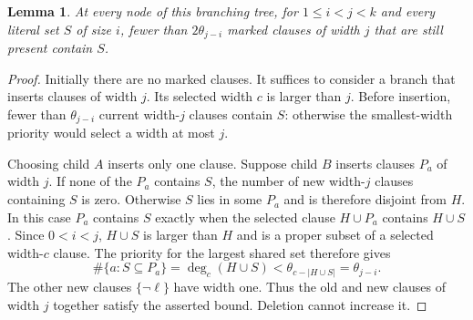 \documentclass[11pt,reqno]{amsart}
\numberwithin{equation}{section}
\newtheorem{lemma}[theorem]{Lemma}
\theoremstyle{definition}\newtheorem{definition}[theorem]{Definition}
\theoremstyle{remark}\newtheorem{remark}[theorem]{Remark}
\renewcommand{\le}{\leqslant}
\begin{document}
\begin{lemma}\label{lem:spar-marked-degree}
At every node of this branching tree, for $1\le i<j<k$ and every
literal set $S$ of size $i$,
fewer than $2\theta_{j-i}$ marked clauses of width $j$ that are
still present contain $S$.
\end{lemma}
\begin{proof}
Initially there are no marked clauses. It suffices to consider a branch
that inserts clauses of width $j$. Its selected width $c$ is larger than
$j$. Before insertion, fewer than $\theta_{j-i}$ current width-$j$
clauses contain $S$: otherwise the smallest-width priority would select
a width at most $j$.

Choosing child $A$ inserts only one clause.
Suppose child $B$ inserts clauses $P_a$ of width $j$.
If none of the $P_a$ contains $S$, the number of new width-$j$ clauses
containing $S$ is zero. Otherwise $S$ lies in some $P_a$ and is therefore
disjoint from $H$. In this case $P_a$ contains $S$ exactly when the
selected clause $H\cup P_a$ contains $H\cup S$. Since $0<i<j$,
$H\cup S$ is larger than $H$ and is a proper subset of a selected
width-$c$ clause.
The priority for the largest shared set therefore gives
\[
 \#\{a:S\subseteq P_a\}
 =\deg_c(H\cup S)<\theta_{c-|H\cup S|}
 =\theta_{j-i}.
\]
The other new clauses $\{\neg\ell\}$ have width one.
Thus the old and new clauses of width $j$ together satisfy the
asserted bound. Deletion cannot increase it.
\end{proof}
\end{document}
